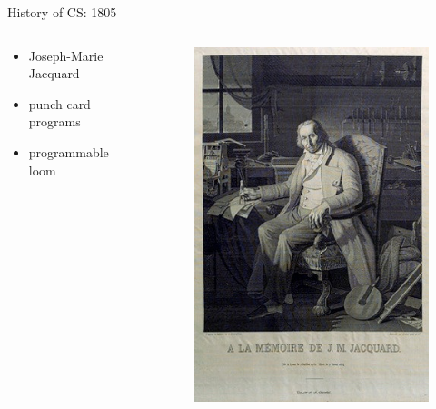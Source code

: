 \documentclass[xcolor={dvipsnames}]{beamer}
\begin{document}
\begin{frame}{History of CS: 1805}
	\begin{columns}
	 \begin{column}{.49\textwidth}
	\begin{itemize}
	\item Joseph-Marie Jacquard
	\item punch card programs
	\item programmable loom
	\end{itemize}
 	\end{column}
	 \begin{column}{.49\textwidth}
  		\begin{figure}
 		\includegraphics[scale=0.5]{Jacquard_Joseph_Marie_woven_silk}
		\end{figure}
	\end{column}
\end{columns}
\end{frame}
\end{document}
